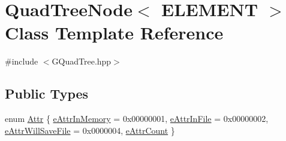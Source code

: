 \hypertarget{class_quad_tree_node}{}\section{Quad\+Tree\+Node$<$ E\+L\+E\+M\+E\+N\+T $>$ Class Template Reference}
\label{class_quad_tree_node}


{\ttfamily \#include $<$G\+Quad\+Tree.\+hpp$>$}

\subsection*{Public Types}
\begin{DoxyCompactItemize}
\item 
enum \hyperlink{class_quad_tree_node_a3d05d6eac38b764cdab142e22b5bebec}{Attr} \{ \hyperlink{class_quad_tree_node_a3d05d6eac38b764cdab142e22b5bebeca77278febec54101bfba7f51a8f647b64}{e\+Attr\+In\+Memory} = 0x00000001, 
\hyperlink{class_quad_tree_node_a3d05d6eac38b764cdab142e22b5bebeca7af36423222076c2b158d4d9b6f5f8b9}{e\+Attr\+In\+File} = 0x00000002, 
\hyperlink{class_quad_tree_node_a3d05d6eac38b764cdab142e22b5bebeca1560e435602324403196d877a954f579}{e\+Attr\+Will\+Save\+File} = 0x0000004, 
\hyperlink{class_quad_tree_node_a3d05d6eac38b764cdab142e22b5bebeca4c980c025152b3f9b80c3386f4d4565d}{e\+Attr\+Count}
 \}
\end{DoxyCompactItemize}
